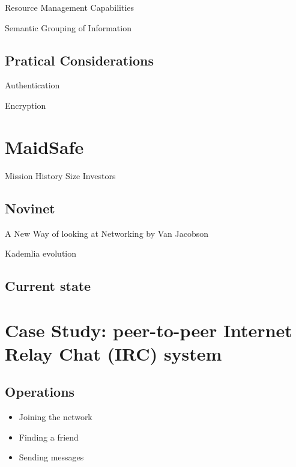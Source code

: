 Resource Management Capabilities

Semantic Grouping of Information


\subsection{Pratical Considerations}

Authentication

Encryption


\section{MaidSafe}

Mission
History
Size
Investors

\subsection{Novinet}

A New Way of looking at Networking by Van Jacobson

Kademlia evolution

\subsection{Current state}




\section{Case Study: peer-to-peer Internet Relay Chat (IRC) system}

\subsection{Operations}
\begin{itemize}
	\item Joining the network
	\item Finding a friend
	\item Sending messages
\end{itemize}
